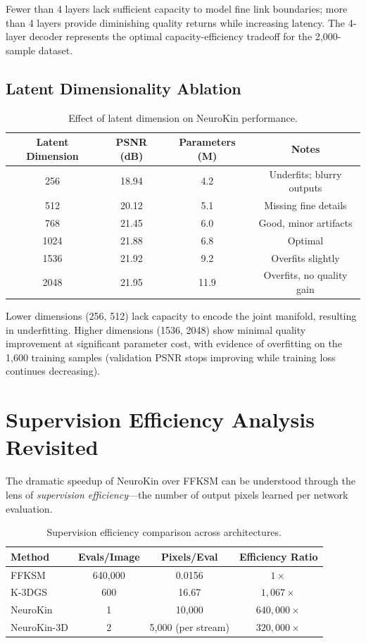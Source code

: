 \documentclass[12pt,a4paper,oneside]{report}
\begin{document}
Fewer than 4 layers lack sufficient capacity to model fine link boundaries; more than 4 layers provide diminishing quality returns while increasing latency. The 4-layer decoder represents the optimal capacity-efficiency tradeoff for the 2,000-sample dataset.

\subsection{Latent Dimensionality Ablation}

\begin{table}[H]
\centering
\caption{Effect of latent dimension on NeuroKin performance.}
\label{tab:latent_ablation}
\begin{tabular}{cccc}
\toprule
Latent Dimension & PSNR (dB) & Parameters (M) & Notes \\
\midrule
256 & 18.94 & 4.2 & Underfits; blurry outputs \\
512 & 20.12 & 5.1 & Missing fine details \\
768 & 21.45 & 6.0 & Good, minor artifacts \\
1024 & 21.88 & 6.8 & Optimal \\
1536 & 21.92 & 9.2 & Overfits slightly \\
2048 & 21.95 & 11.9 & Overfits, no quality gain \\
\bottomrule
\end{tabular}
\end{table}

Lower dimensions (256, 512) lack capacity to encode the joint manifold, resulting in underfitting. Higher dimensions (1536, 2048) show minimal quality improvement at significant parameter cost, with evidence of overfitting on the 1,600 training samples (validation PSNR stops improving while training loss continues decreasing).

\section{Supervision Efficiency Analysis Revisited}

The dramatic speedup of NeuroKin over FFKSM can be understood through the lens of \textit{supervision efficiency}—the number of output pixels learned per network evaluation.

\begin{table}[H]
\centering
\caption{Supervision efficiency comparison across architectures.}
\label{tab:supervision_efficiency}
\begin{tabular}{lccc}
\toprule
\textbf{Method} & \textbf{Evals/Image} & \textbf{Pixels/Eval} & \textbf{Efficiency Ratio} \\
\midrule
FFKSM & 640,000 & 0.0156 & $1\times$ \\
K-3DGS & 600 & 16.67 & $1,067\times$ \\
NeuroKin & 1 & 10,000 & $640,000\times$ \\
NeuroKin-3D & 2 & 5,000 (per stream) & $320,000\times$ \\
\bottomrule
\end{tabular}
\end{table}
\end{document}
